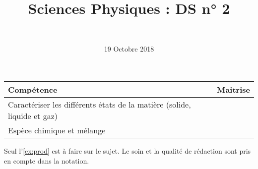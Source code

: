 \documentclass[a4paper,11pt]{exam}
\author{\ }
\date{19 Octobre 2018}
\title{Sciences Physiques : DS n° 2}
\begin{document}
%	

	\maketitle
	
\begin{small}
	\begin{center}
		\begin{tabular}{|@{\ }l@{}|@{\ }c@{\ }|}
			\hline
			\textbf{Compétence} & \textbf{Maitrise} \\
			\hline
			Caractériser les différents états de la matière (solide, liquide et gaz)\ &  \ \ \ \\
			\hline	
			Espèce chimique et mélange\ &  \ \ \ \\
			\hline
		\end{tabular}
	\end{center}
\end{small}	
	
	

%

%

Seul l'\ref{ex:prod} est à faire sur le sujet. Le soin et la qualité de rédaction sont pris en compte dans la notation.







%









 
%
\ \label{LastPage}
\end{document}
